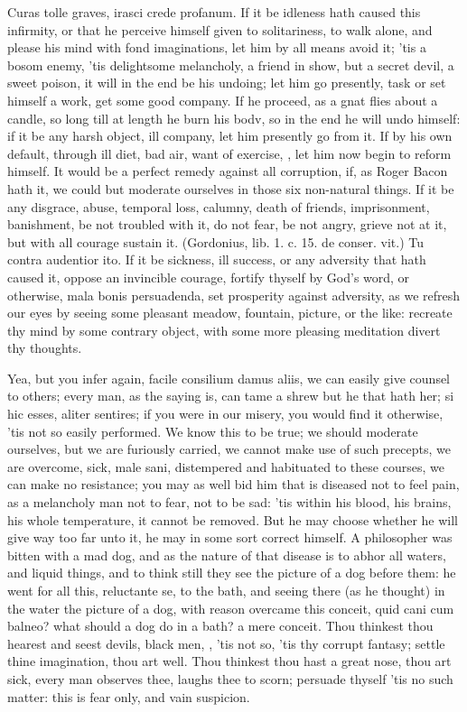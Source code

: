 {Curas tolle graves, irasci crede profanum. If it be idleness hath
caused this infirmity, or that he perceive himself given to
solitariness, to walk alone, and please his mind with fond
imaginations, let him by all means avoid it; 'tis a bosom enemy, 'tis
delightsome melancholy, a friend in show, but a secret devil, a sweet
poison, it will in the end be his undoing; let him go presently, task
or set himself a work, get some good company. If he proceed, as a gnat
flies about a candle, so long till at length he burn his bodv, so in
the end he will undo himself: if it be any harsh object, ill company,
let him presently go from it. If by his own default, through ill diet,
bad air, want of exercise, \etc{}, let him now begin to reform himself. It
would be a perfect remedy against all corruption, if, as Roger
Bacon hath it, we could but moderate ourselves in those six non-natural
things. If it be any disgrace, abuse, temporal loss, calumny,
death of friends, imprisonment, banishment, be not troubled with it, do
not fear, be not angry, grieve not at it, but with all courage sustain
it. (Gordonius, lib. 1. c. 15. de conser. vit.) Tu contra audentior
ito. If it be sickness, ill success, or any adversity that hath
caused it, oppose an invincible courage, fortify thyself by God's word,
or otherwise, mala bonis persuadenda, set prosperity against adversity,
as we refresh our eyes by seeing some pleasant meadow, fountain,
picture, or the like: recreate thy mind by some contrary object, with
some more pleasing meditation divert thy thoughts.

Yea, but you infer again, facile consilium damus aliis, we can easily
give counsel to others; every man, as the saying is, can tame a shrew
but he that hath her; si hic esses, aliter sentires; if you were in our
misery, you would find it otherwise, 'tis not so easily performed. We
know this to be true; we should moderate ourselves, but we are
furiously carried, we cannot make use of such precepts, we are
overcome, sick, male sani, distempered and habituated to these courses,
we can make no resistance; you may as well bid him that is diseased not
to feel pain, as a melancholy man not to fear, not to be sad: 'tis
within his blood, his brains, his whole temperature, it cannot be
removed. But he may choose whether he will give way too far unto it, he
may in some sort correct himself. A philosopher was bitten with a mad
dog, and as the nature of that disease is to abhor all waters, and
liquid things, and to think still they see the picture of a dog before
them: he went for all this, reluctante se, to the bath, and seeing
there (as he thought) in the water the picture of a dog, with reason
overcame this conceit, quid cani cum balneo? what should a dog do in a
bath? a mere conceit. Thou thinkest thou hearest and seest devils,
black men, \etc{}, 'tis not so, 'tis thy corrupt fantasy; settle thine
imagination, thou art well. Thou thinkest thou hast a great nose, thou
art sick, every man observes thee, laughs thee to scorn; persuade
thyself 'tis no such matter: this is fear only, and vain suspicion.

}
